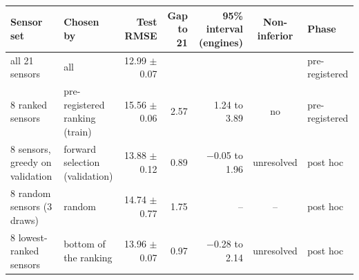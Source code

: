\begin{tabular}{llrrrcl}
\toprule
Sensor set & Chosen by & Test RMSE & Gap to 21 & 95\% interval (engines) & Non-inferior & Phase \\
\midrule
all 21 sensors & all & 12.99 $\pm$ 0.07 &  &  &  & pre-registered \\
8 ranked sensors & pre-registered ranking (train) & 15.56 $\pm$ 0.06 & 2.57 & 1.24 to 3.89 & no & pre-registered \\
8 sensors, greedy on validation & forward selection (validation) & 13.88 $\pm$ 0.12 & 0.89 & $-$0.05 to 1.96 & unresolved & post hoc \\
8 random sensors (3 draws) & random & 14.74 $\pm$ 0.77 & 1.75 & -- & -- & post hoc \\
8 lowest-ranked sensors & bottom of the ranking & 13.96 $\pm$ 0.07 & 0.97 & $-$0.28 to 2.14 & unresolved & post hoc \\
\bottomrule
\end{tabular}
